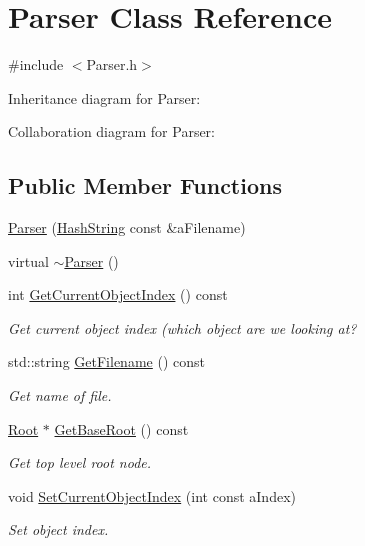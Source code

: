 \hypertarget{classParser}{}\section{Parser Class Reference}
\label{classParser}


{\ttfamily \#include $<$Parser.\+h$>$}



Inheritance diagram for Parser\+:


Collaboration diagram for Parser\+:
\subsection*{Public Member Functions}
\begin{DoxyCompactItemize}
\item 
\hyperlink{classParser_aa83a3c8c6536591ed22ee8352e903f88}{Parser} (\hyperlink{classHashString}{Hash\+String} const \&a\+Filename)
\item 
virtual \hyperlink{classParser_a3e658b5917a93a3ef648050d060e3a93}{$\sim$\+Parser} ()
\item 
int \hyperlink{classParser_aa95b132e2875cb6c816740a5b6efb7ed}{Get\+Current\+Object\+Index} () const 
\begin{DoxyCompactList}\small\item\em Get current object index (which object are we looking at? \end{DoxyCompactList}\item 
std\+::string \hyperlink{classParser_aae90f9344fac5f47ec4d04e0a0e80be7}{Get\+Filename} () const 
\begin{DoxyCompactList}\small\item\em Get name of file. \end{DoxyCompactList}\item 
\hyperlink{classRoot}{Root} $\ast$ \hyperlink{classParser_a0db07cea3d0fe45e8172c43fb48ed751}{Get\+Base\+Root} () const 
\begin{DoxyCompactList}\small\item\em Get top level root node. \end{DoxyCompactList}\item 
void \hyperlink{classParser_a8669bde3f52d54908dcf48f61aee0944}{Set\+Current\+Object\+Index} (int const a\+Index)
\begin{DoxyCompactList}\small\item\em Set object index. \end{DoxyCompactList}\item 

\end{DoxyCompactItemize}
